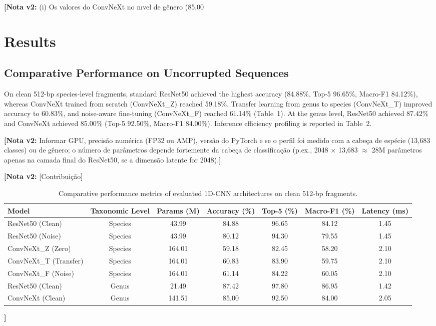 \documentclass[11pt,a4paper]{article}
\newcommand{\notavdois}[1]{\par\vspace{0.4em}\noindent\colorbox{yellow!25}{\begin{minipage}{0.96\linewidth}\footnotesize\textbf{[Nota v2:} #1\textbf{]}\end{minipage}}\par\vspace{0.4em}}
\begin{document}
\notavdois{(i) Os valores do ConvNeXt no nıvel de gênero (85,00\\%


\section{Results}

\subsection{Comparative Performance on Uncorrupted Sequences}
On clean 512-bp species-level fragments, standard ResNet50 achieved the highest accuracy (84.88\%, Top-5 96.65\%, Macro-F1 84.12\%), whereas ConvNeXt trained from scratch (ConvNeXt\_Z) reached 59.18\%. Transfer learning from genus to species (ConvNeXt\_T) improved accuracy to 60.83\%, and noise-aware fine-tuning (ConvNeXt\_F) reached 61.14\% (Table~1). At the genus level, ResNet50 achieved 87.42\% and ConvNeXt achieved 85.00\% (Top-5 92.50\%, Macro-F1 84.00\%).
Inference efficiency profiling is reported in Table~2.

\notavdois{Informar GPU, precisão numérica (FP32 ou AMP), versão do PyTorch e se o perfil foi medido com a cabeça de espécie (13,683 classes) ou de gênero; o número de parâmetros depende fortemente da cabeça de classificação (p.ex., 2048 × 13,683 $\approx$ 28M parâmetros apenas na camada final do ResNet50, se a dimensão latente for 2048).}


\notavdois{[Contribuição}


\begin{table}[h!]
\centering
\small
\caption{Comparative performance metrics of evaluated 1D-CNN architectures on clean 512-bp fragments.}
\begin{tabular}{lcccccc}
\toprule
\textbf{Model} & \textbf{Taxonomic Level} & \textbf{Params (M)} & \textbf{Accuracy (\%)} & \textbf{Top-5 (\%)} & \textbf{Macro-F1 (\%)} & \textbf{Latency (ms)} \\
\midrule
ResNet50 (Clean) & Species & 43.99 & 84.88 & 96.65 & 84.12 & 1.45 \\
ResNet50 (Noise) & Species & 43.99 & 80.12 & 94.30 & 79.55 & 1.45 \\
ConvNeXt\_Z (Zero) & Species & 164.01 & 59.18 & 82.45 & 58.20 & 2.10 \\
ConvNeXt\_T (Transfer) & Species & 164.01 & 60.83 & 83.90 & 59.75 & 2.10 \\
ConvNeXt\_F (Noise) & Species & 164.01 & 61.14 & 84.22 & 60.05 & 2.10 \\
ResNet50 (Clean) & Genus & 21.49 & 87.42 & 97.80 & 86.95 & 1.42 \\
ConvNeXt (Clean) & Genus & 141.51 & 85.00 & 92.50 & 84.00 & 2.05 \\
\bottomrule
\end{tabular}
\end{table}

}
\end{document}
